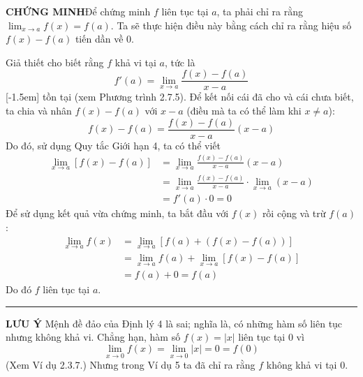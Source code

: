 \noindent\textbf{\textsf{\textcolor{stewartred}{CHỨNG MINH}}}\hspace{1.2em}Để chứng minh $f$ liên tục tại $a$, ta phải chỉ ra rằng $\lim_{x \to a} f(x) = f(a)$. Ta sẽ thực hiện điều này bằng cách chỉ ra rằng hiệu số $f(x) - f(a)$ tiến dần về $0$.

Giả thiết cho biết rằng $f$ khả vi tại $a$, tức là
\[
f'(a) = \lim_{x \to a} \frac{f(x) - f(a)}{x - a}
\]
[-1.5em]%
\noindent tồn tại (xem Phương trình 2.7.5). Để kết nối cái đã cho và cái chưa biết, ta chia và nhân $f(x) - f(a)$ với $x - a$ (điều mà ta có thể làm khi $x \neq a$):
\[
f(x) - f(a) = \frac{f(x) - f(a)}{x - a}(x - a)
\]
Do đó, sử dụng Quy tắc Giới hạn 4, ta có thể viết
\begin{align*}
\lim_{x \to a} [f(x) - f(a)] &= \lim_{x \to a} \frac{f(x) - f(a)}{x - a}(x - a) \\[3pt]
&= \lim_{x \to a} \frac{f(x) - f(a)}{x - a} \cdot \lim_{x \to a}(x - a) \\[3pt]
&= f'(a) \cdot 0 = 0
\end{align*}
Để sử dụng kết quả vừa chứng minh, ta bắt đầu với $f(x)$ rồi cộng và trừ $f(a)$:
\begin{align*}
\lim_{x \to a} f(x) &= \lim_{x \to a} [f(a) + (f(x) - f(a))] \\[3pt]
&= \lim_{x \to a} f(a) + \lim_{x \to a} [f(x) - f(a)] \\[3pt]
&= f(a) + 0 = f(a)
\end{align*}
Do đó $f$ liên tục tại $a$.\hfill\textcolor{stewartred}{\rule{1.1ex}{1.1ex}}

\vspace{1.5em}
\noindent{}\hspace{0.5em}%
\textbf{\textsf{\textcolor{stewartred}{LƯU Ý}}}\hspace{1.2em}%
\textcolor{stewartred}{Mệnh đề đảo của Định lý 4 là sai; nghĩa là, có những hàm số liên tục nhưng không khả vi.} Chẳng hạn, hàm số $f(x) = |x|$ liên tục tại $0$ vì
\[
\lim_{x \to 0} f(x) = \lim_{x \to 0} |x| = 0 = f(0)
\]
\noindent (Xem Ví dụ 2.3.7.) Nhưng trong Ví dụ 5 ta đã chỉ ra rằng $f$ không khả vi tại $0$.

